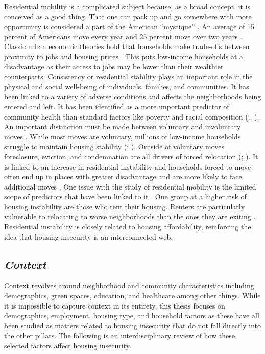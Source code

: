 Residential mobility is a complicated subject because, as a broad concept, it is conceived as a good thing. That one can pack up and go somewhere with more opportunity is considered a part of the American “mystique” \citep{molloy_internal_2011}. An average of 15 percent of Americans move every year and 25 percent move over two years \citep{bachmann_ins_2014}. Classic urban economic theories hold that households make trade-offs between proximity to jobs and housing prices \citep{hu_housing_2019}. This puts low-income households at a disadvantage as their access to jobs may be lower than their wealthier counterparts. Consistency or residential stability plays an important role in the physical and social well-being of individuals, families, and communities. It has been linked to a variety of adverse conditions and affects the neighborhoods being entered and left. It has been identified as a more important predictor of community health than standard factors like poverty and racial composition (\citealp{desmond_forced_2015};\citealp{desmond_housing_2016}, \citealp{rauh_housing_2008}). An important distinction must be made between voluntary and involuntary moves \citep{siskar_who_2019}. While most moves are voluntary, millions of low-income households struggle to maintain housing stability (\citealp{phinney_exploring_2013}; \citealp{kang_why_2019}). Outside of voluntary moves foreclosure, eviction, and condemnation are all drivers of forced relocation (\citealp{phinney_exploring_2013}; \citealp{siskar_who_2019}). It is linked to an increase in residential instability and households forced to move often end up in places with greater disadvantage and are more likely to face additional moves \citep{desmond_forced_shell_2015}. One issue with the study of residential mobility is the limited scope of predictors that have been linked to it \citep{kang_why_2019}. One group at a higher risk of housing instability are those who rent their housing. Renters are particularly vulnerable to relocating to worse neighborhoods than the ones they are exiting \citep{desmond_forced_2015}. Residential instability is closely related to housing affordability, reinforcing the idea that housing insecurity is an interconnected web.

\subsection{\textit{Context}}

Context revolves around neighborhood and community characteristics including demographics, green spaces, education, and healthcare among other things. While it is impossible to capture context in its entirety, this thesis focuses on demographics, employment, housing type, and household factors as these have all been studied as matters related to housing insecurity that do not fall directly into the other pillars. The following is an interdisciplinary review of how these selected factors affect housing insecurity.  

